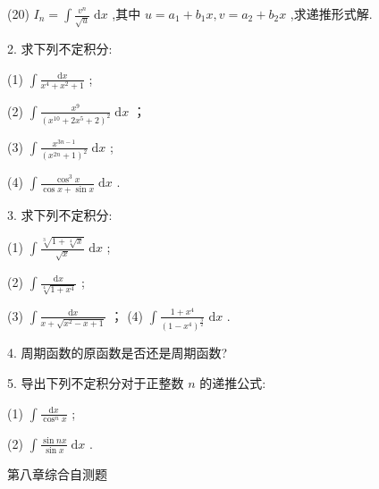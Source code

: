 (20) \({I}_{n} = \int \frac{{v}^{n}}{\sqrt{u}}\mathrm{\;d}x\) ,其中 \(u = {a}_{1} + {b}_{1}x,v = {a}_{2} + {b}_{2}x\) ,求递推形式解.

2. 求下列不定积分:

(1) \(\int \frac{\mathrm{d}x}{{x}^{4} + {x}^{2} + 1}\) ;

(2) \(\int \frac{{x}^{9}}{{\left( {x}^{10} + 2{x}^{5} + 2\right) }^{2}}\mathrm{\;d}x\) ；

(3) \(\int \frac{{x}^{{3n} - 1}}{{\left( {x}^{2n} + 1\right) }^{2}}\mathrm{\;d}x\) ;

(4) \(\int \frac{{\cos }^{3}x}{\cos x + \sin x}\mathrm{\;d}x\) .

3. 求下列不定积分:

(1) \(\int \frac{\sqrt[3]{1 + \sqrt[4]{x}}}{\sqrt{x}}\mathrm{\;d}x\) ;

(2) \(\int \frac{\mathrm{d}x}{\sqrt[4]{1 + {x}^{4}}}\) ;

(3) \(\int \frac{\mathrm{d}x}{x + \sqrt{{x}^{2} - x + 1}}\) ； (4) \(\int \frac{1 + {x}^{4}}{{\left( 1 - {x}^{4}\right) }^{\frac{3}{2}}}\mathrm{\;d}x\) .

4. 周期函数的原函数是否还是周期函数?

5. 导出下列不定积分对于正整数 \(n\) 的递推公式:

(1) \(\int \frac{\mathrm{d}x}{{\cos }^{n}x}\) ;

(2) \(\int \frac{\sin {nx}}{\sin x}\mathrm{\;d}x\) .

第八章综合自测题

